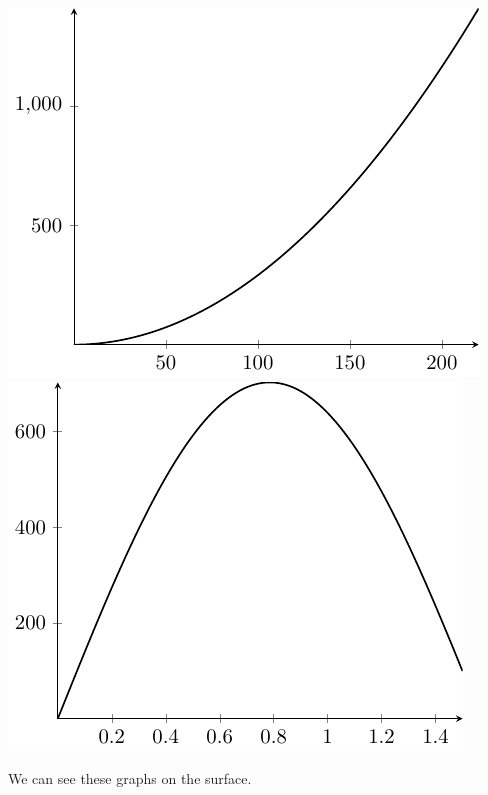 \begin{example}
    \begin{center}
        \includegraphics[scale=1]{tikz-pictures/section-9.1-again-pic2-2d-graphs-1.pdf}
        \hfill 
        \includegraphics[scale=1]{tikz-pictures/section-9.1-again-pic2-2d-graphs-2.pdf}
    \end{center}
    
    \bigskip 
    
    We can see these graphs on the surface.
    \bigskip 
    

\end{example}
